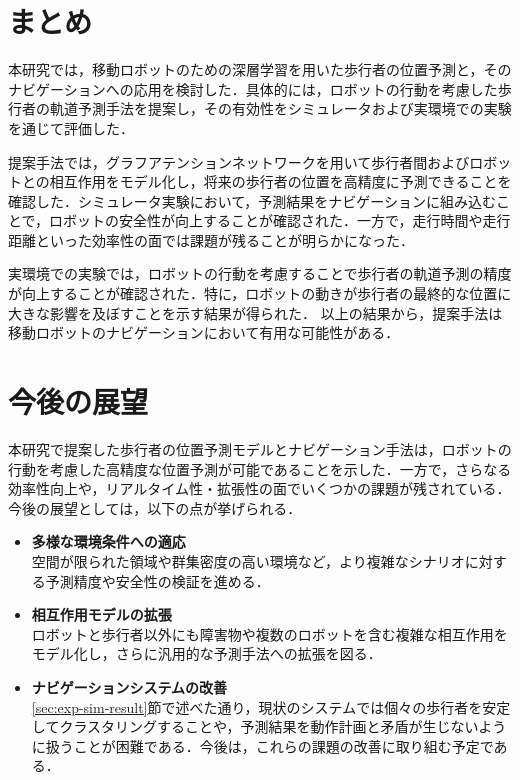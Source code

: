 
\section{まとめ}
本研究では，移動ロボットのための深層学習を用いた歩行者の位置予測と，そのナビゲーションへの応用を検討した．具体的には，ロボットの行動を考慮した歩行者の軌道予測手法を提案し，その有効性をシミュレータおよび実環境での実験を通じて評価した．

提案手法では，グラフアテンションネットワークを用いて歩行者間およびロボットとの相互作用をモデル化し，将来の歩行者の位置を高精度に予測できることを確認した．シミュレータ実験において，予測結果をナビゲーションに組み込むことで，ロボットの安全性が向上することが確認された．一方で，走行時間や走行距離といった効率性の面では課題が残ることが明らかになった．

実環境での実験では，ロボットの行動を考慮することで歩行者の軌道予測の精度が向上することが確認された．特に，ロボットの動きが歩行者の最終的な位置に大きな影響を及ぼすことを示す結果が得られた．
以上の結果から，提案手法は移動ロボットのナビゲーションにおいて有用な可能性がある．

\newpage

\section{今後の展望}
本研究で提案した歩行者の位置予測モデルとナビゲーション手法は，ロボットの行動を考慮した高精度な位置予測が可能であることを示した．一方で，さらなる効率性向上や，リアルタイム性・拡張性の面でいくつかの課題が残されている．今後の展望としては，以下の点が挙げられる．

\begin{itemize}
  \item \textbf{多様な環境条件への適応} \\
  空間が限られた領域や群集密度の高い環境など，より複雑なシナリオに対する予測精度や安全性の検証を進める．
  \item \textbf{相互作用モデルの拡張} \\
  ロボットと歩行者以外にも障害物や複数のロボットを含む複雑な相互作用をモデル化し，さらに汎用的な予測手法への拡張を図る．
  \item \textbf{ナビゲーションシステムの改善} \\
  \ref{sec:exp-sim-result}節で述べた通り，現状のシステムでは個々の歩行者を安定してクラスタリングすることや，予測結果を動作計画と矛盾が生じないように扱うことが困難である．今後は，これらの課題の改善に取り組む予定である．
\end{itemize}

\newpage